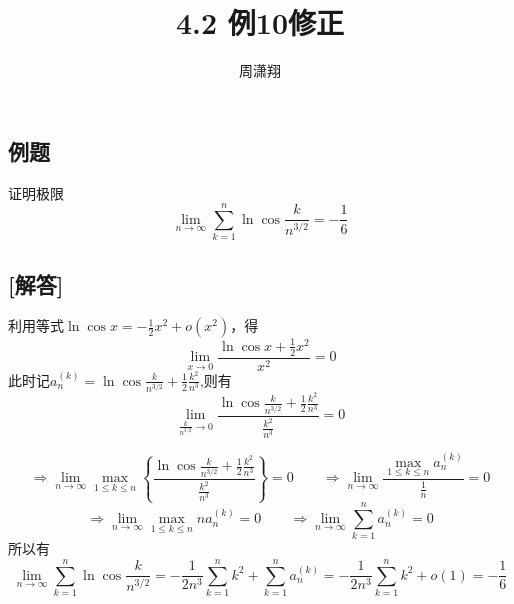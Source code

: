 \documentclass{ctexart}
\begin{document}
	
	\title{4.2 例10修正} %
	
	\author{周潇翔} %
	
	
	
	\maketitle %
	
	
	
	
\subsection*{例题}
		
		证明极限
		$$\lim\limits_{n\rightarrow \infty}\sum_{k=1}^{n} \ln \cos \frac{k}{n^{3/2}}=-\frac{1}{6}$$
\subsection*{[解答]}
	利用等式$\ln \cos x=-\frac{1}{2}x^2+o(x^2)$，得
		$$\lim\limits_{x\rightarrow 0}\frac{\displaystyle \ln \cos x+\frac{1}{2}x^2}{x^2}=0$$
		此时记$\displaystyle a_n^{(k)}=\ln \cos \frac{k}{n^{3/2}}+\frac{1}{2} \frac{k^2}{n^3}$,则有
		$$\lim\limits_{\frac{k}{n^{3/2}}\rightarrow 0}\frac{\displaystyle \ln \cos \frac{k}{n^{3/2}}+\frac{1}{2} \frac{k^2}{n^3}}{\displaystyle \frac{k^2}{n^3}}=0$$
		
		$$\Rightarrow\lim\limits_{n\rightarrow \infty} \max_{1\leqslant k\leqslant n}
		\left\lbrace 
		\frac{\displaystyle \ln \cos \frac{k}{n^{3/2}}+\frac{1}{2}
			\frac{k^2}{n^3}}{\displaystyle \frac{k^2}{n^3}}
		\right\rbrace =0
		\qquad
\Rightarrow\lim\limits_{n\rightarrow \infty}\frac{\displaystyle \max_{1\leqslant k\leqslant n} a_n^{(k)}}{\displaystyle \frac{1}{n}}=0$$
		$$\Rightarrow\lim\limits_{n\rightarrow \infty} \max_{1\leqslant k\leqslant n} n a_n^{(k)}=0
		\qquad
	\Rightarrow\lim\limits_{n\rightarrow \infty} \sum_{k=1}^n a_n^{(k)}=0$$
	所以有
	$$\lim\limits_{n\rightarrow \infty}\sum_{k=1}^{n} \ln \cos \frac{k}{n^{3/2}}=-\frac{1}{2n^3}\sum_{k=1}^{n}k^2 +\sum_{k=1}^n a_n^{(k)}
	=-\frac{1}{2n^3}\sum_{k=1}^{n}k^2 +o(1)
	=-\frac{1}{6}
	$$
\end{document}
